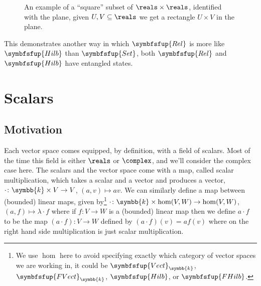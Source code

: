 \documentclass[fleqn]{NotesClass}
\makeatletter
\newcommand{\c@egory}[1]{\symbfsfup{#1}}
\newcommand{\Set}{\c@egory{Set}}
\newcommand{\Rel}{\c@egory{Rel}}
\renewcommand{\field}{\symbb{k}}
\newcommand{\Vect}[1][\field]{{\c@egory{Vect}_{#1}}}
\newcommand{\FVect}[1][\field]{{\c@egory{FVect}_{#1}}}
\newcommand{\Hilb}{\c@egory{Hilb}}
\newcommand{\FHilb}{\c@egory{FHilb}}
\makeatother
\begin{document}
    \begin{figure}
        \caption{An example of a \enquote{square} subset of \(\reals \times \reals\), identified with the plane, given \(U, V \subseteq \reals\) we get a rectangle \(U \times V\) in the plane.}
        \label{fig:square subset}
    \end{figure}
    
    This demonstrates another way in which \(\Rel\) is more like \(\Hilb\) than \(\Set\), both \(\Rel\) and \(\Hilb\) have entangled states.
    
    \chapter{Scalars}
    \section{Motivation}
    Each vector space comes equipped, by definition, with a field of scalars.
    Most of the time this field is either \(\reals\) or \(\complex\), and we'll consider the complex case here.
    The scalars and the vector space come with a map, called scalar multiplication, which takes a scalar and a vector and produces a vector, \(\cdot \colon \field \times V \to V\), \((a, v) \mapsto a v\).
    We can similarly define a map between (bounded) linear maps, given by\footnote{We use \(\hom\) here to avoid specifying exactly which category of vector spaces we are working in, it could be \(\Vect\), \(\FVect\), \(\Hilb\), or \(\FHilb\).} \(\cdot \colon \field \times \hom(V, W) \to \hom(V, W)\), \((a, f) \mapsto \lambda \cdot f\) where if \(f \colon V \to W\) is a (bounded) linear map then we define \(a \cdot f\) to be the map \((a \cdot f ) \colon V \to W\) defined by \((a \cdot f)(v) = a f(v)\) where on the right hand side multiplication is just scalar multiplication.
    
\end{document}
